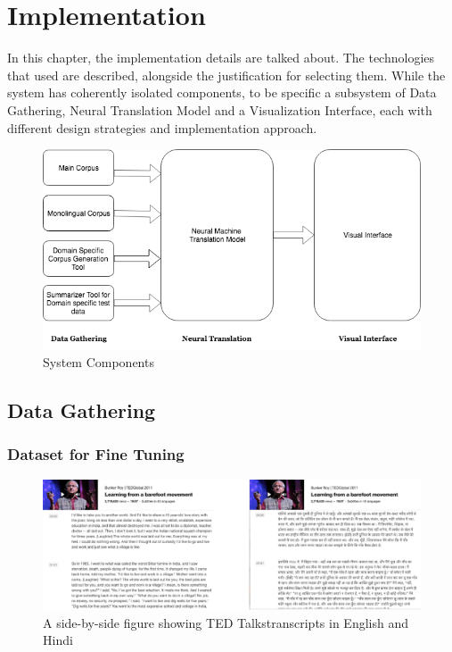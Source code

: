 \chapter{Implementation}
In this chapter, the implementation details are talked about. The technologies that used are described, alongside the justification for selecting them. While the system has coherently isolated components, to be specific a subsystem of Data Gathering, Neural Translation Model and a Visualization Interface, each with different design strategies and implementation approach.

\begin{figure}[h]
\includegraphics[width=\textwidth]{figures/maindesign.png}
\caption{System Components} \label{system}
\end{figure}

\section{Data Gathering}
\subsection{Dataset for Fine Tuning}
\begin{figure}
\includegraphics[width=\textwidth]{figures/tedtalks.png}
\caption{A side-by-side figure showing TED Talks\footnotemark  transcripts in English and Hindi} \label{fig1}
\end{figure}
